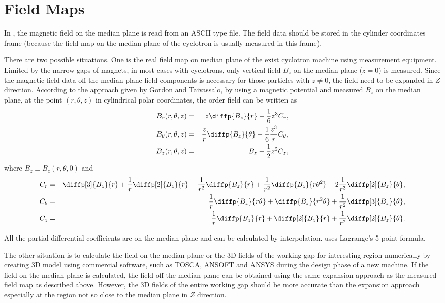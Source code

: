 \section{Field Maps}
\label{sec:opalcycl:fieldmap}
In \opalcycl, the magnetic field on the median plane is read from an ASCII type file. The field data should be stored in the cylinder coordinates frame (because the field map on the median plane of the cyclotron is usually measured in this frame).

There are two possible situations. One is the real field map on median plane of the exist cyclotron machine using measurement equipment.
Limited by the narrow gaps of magnets, in most cases with cyclotrons, only vertical field $B_z$ on the median plane ($z=0$) is measured.
Since the magnetic field data off the median plane field components is necessary for those particles with $z \neq 0$, the field need to be expanded in $Z$ direction.
According to the approach given by Gordon and Taivassalo, by using a magnetic potential and measured $B_z$ on the median plane,
at the point $(r,\theta, z)$ in cylindrical polar coordinates, the  order field can be written as
\begin{eqnarray}\label{eq:Bfield}
  B_r(r,\theta, z) & = & z\diffp{B_z}{ r}-\frac{1}{6}z^3 C_r, \nonumber\\
  B_\theta(r,\theta, z) & = & \frac{z}{r}\diffp{B_z}{\theta}-\frac{1}{6}\frac{z^3}{r} C_{\theta}, \\
  B_z(r,\theta, z) & = & B_z-\frac{1}{2}z^2 C_z,  \nonumber
\end{eqnarray}
where $B_z\equiv B_z(r, \theta, 0)$ and
\begin{eqnarray}\label{eq:Bcoeff}
  C_r & = & \diffp[3]{B_z}{r} + \frac{1}{r}\diffp[2]{B_z}{r} - \frac{1}{r^2}\diffp{B_z}{r}
        + \frac{1}{r^2}\diffp{B_z}{{r}{\theta^2}} - 2\frac{1}{r^3}\diffp[2]{B_z}{\theta}, \nonumber  \\
  C_{\theta} & = & \frac{1}{r}\diffp{B_z}{{r}{\theta}} + \diffp{B_z}{{r^2}{\theta}}
        + \frac{1}{r^2}\diffp[3]{B_z}{\theta},  \\
  C_z & = & \frac{1}{r}\diffp{B_z}{r} + \diffp[2]{B_z}{r} + \frac{1}{r^2}\diffp[2]{B_z}{\theta}. \nonumber
\end{eqnarray}

All the partial differential coefficients are on the median plane and can be calculated by interpolation. \opalcycl uses  Lagrange's  5-point formula.

The other situation is to calculate the field on the median plane or the 3D fields of the working gap for interesting region numerically by creating 3D model using commercial software,
such as TOSCA, ANSOFT and ANSYS during the design phase of a new machine. If the field on the median plane is calculated, the field off the median plane can be obtained using
the same expansion approach as the measured field map as described above. However, the 3D fields of the entire working gap should be more accurate than
the expansion approach  especially at the region not so close to the median plane in $Z$ direction.

